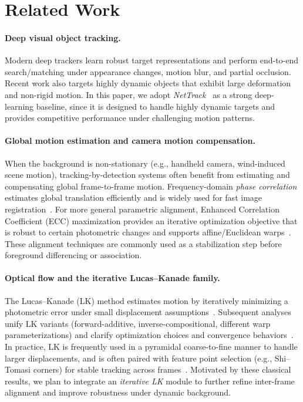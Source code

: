 \section{Related Work}
\label{related_work}

\paragraph{Deep visual object tracking.}
Modern deep trackers learn robust target representations and perform end-to-end search/matching under appearance changes, motion blur, and partial occlusion.
Recent work also targets highly dynamic objects that exhibit large deformation and non-rigid motion.
In this paper, we adopt \emph{NetTrack}~\cite{zheng2024nettrack} as a strong deep-learning baseline, since it is designed to handle highly dynamic targets and provides competitive performance under challenging motion patterns.

\paragraph{Global motion estimation and camera motion compensation.}
When the background is non-stationary (e.g., handheld camera, wind-induced scene motion), tracking-by-detection systems often benefit from estimating and compensating global frame-to-frame motion.
Frequency-domain \emph{phase correlation} estimates global translation efficiently and is widely used for fast image registration~\cite{kuglin1975phase}.
For more general parametric alignment, Enhanced Correlation Coefficient (ECC) maximization provides an iterative optimization objective that is robust to certain photometric changes and supports affine/Euclidean warps~\cite{evangelidis2008ecc}.
These alignment techniques are commonly used as a stabilization step before foreground differencing or association.

\paragraph{Optical flow and the iterative Lucas--Kanade family.}
The Lucas--Kanade (LK) method estimates motion by iteratively minimizing a photometric error under small displacement assumptions~\cite{lucas1981iterative}.
Subsequent analyses unify LK variants (forward-additive, inverse-compositional, different warp parameterizations) and clarify optimization choices and convergence behaviors~\cite{baker2004lucaskanade}.
In practice, LK is frequently used in a pyramidal coarse-to-fine manner to handle larger displacements, and is often paired with feature point selection (e.g., Shi--Tomasi corners) for stable tracking across frames~\cite{bouguet2002pyrLK,shi1994good}.
Motivated by these classical results, we plan to integrate an \emph{iterative LK} module to further refine inter-frame alignment and improve robustness under dynamic background.

